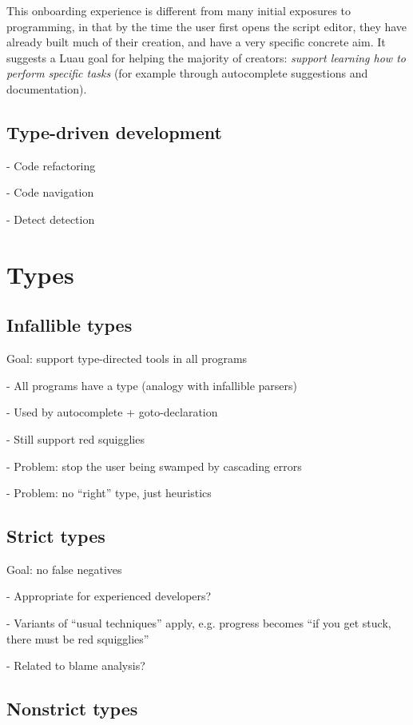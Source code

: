 \documentclass[acmsmall]{acmart}
\begin{document}
This onboarding experience is different from many initial exposures to
programming, in that by the time the user first opens the script
editor, they have already built much of their creation, and have a
very specific concrete aim.  It suggests a Luau goal for helping the
majority of creators: \emph{support learning how to perform specific
tasks} (for example through autocomplete suggestions and
documentation).

\subsection{Type-driven development}

- Code refactoring

- Code navigation

- Detect detection

\section{Types}
\subsection{Infallible types}

Goal: support type-directed tools in all programs

- All programs have a type (analogy with infallible parsers)

- Used by autocomplete + goto-declaration

- Still support red squigglies

- Problem: stop the user being swamped by cascading errors

- Problem: no ``right'' type, just heuristics

\subsection{Strict types}

Goal: no false negatives

- Appropriate for experienced developers?

- Variants of ``usual techniques'' apply, e.g. progress becomes ``if you get stuck, there must be red squigglies''

- Related to blame analysis?

\subsection{Nonstrict types}
\end{document}
